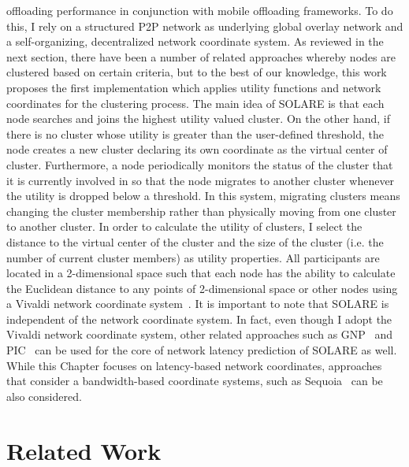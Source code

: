 offloading performance in conjunction with mobile offloading frameworks.
%
To do this, I rely on a structured P2P network as underlying global
overlay network and a self-organizing, decentralized network coordinate
system.
%
As reviewed in the next section, there have been a number of related
approaches whereby nodes are clustered based on certain criteria, but to
the best of our knowledge, this work proposes the first implementation
which applies utility functions and network coordinates for the
clustering process.
%
The main idea of SOLARE is that each node searches and joins the highest
utility valued cluster.
%
On the other hand, if there is no cluster whose utility is greater than
the user-defined threshold, the node creates a new cluster declaring its
own coordinate as the virtual center of cluster.
%
Furthermore, a node periodically monitors the status of the cluster that
it is currently involved in so that the node migrates to another cluster
whenever the utility is dropped below a threshold.
%
In this system, migrating clusters means changing the cluster membership
rather than physically moving from one cluster to another cluster.
%
In order to calculate the utility of clusters, I select the distance to
the virtual center of the cluster and the size of the cluster (i.e. the
number of current cluster members) as utility properties.
%
All participants are located in a 2-dimensional space such that each
node has the ability to calculate the Euclidean distance to any points
of 2-dimensional space or other nodes using a Vivaldi network coordinate
system~\cite{vivaldi}.
%
It is important to note that SOLARE is independent of the network
coordinate system.
%
In fact, even though I adopt the Vivaldi network coordinate system,
other related approaches such as GNP~\cite{gnp} and PIC~\cite{pic} can be used for the core of
network latency prediction of SOLARE as well.
%
While this Chapter focuses on latency-based network coordinates,
approaches that consider a bandwidth-based coordinate systems, such as
Sequoia~\cite{ramasu, treeness} can be also considered.
%

\section{Related Work}
\label{solare:related}
